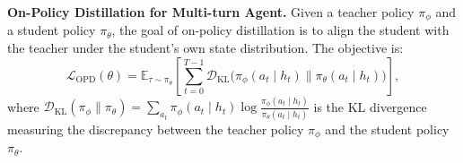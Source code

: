 \documentclass{article} %
\begin{document}
\textbf{On-Policy Distillation for Multi-turn Agent.}
Given a teacher policy $\pi_\phi$ and a student policy $\pi_\theta$, 
the goal of on-policy distillation is to align the student with the 
teacher under the student's own state distribution. The objective is:
\begin{equation}
    \mathcal{L}_{\text{OPD}}(\theta)
    = \mathbb{E}_{\tau \sim \pi_\theta}
    \left[
    \sum_{t=0}^{T-1}
    \mathcal{D}_{\mathrm{KL}}
    \big(
    \pi_\phi(a_t \mid h_t)
    \parallel
    \pi_\theta(a_t \mid h_t)
    \big)
    \right],
\end{equation}
where $\mathcal{D}_{\mathrm{KL}}(\pi_\phi \parallel \pi_\theta) = \sum_{a_t} \pi_\phi(a_t \mid h_t) \log \frac{\pi_\phi(a_t \mid h_t)}{\pi_\theta(a_t \mid h_t)}$ is the KL divergence measuring the discrepancy between the teacher policy $\pi_\phi$ and the student policy $\pi_\theta$.


\end{document}
